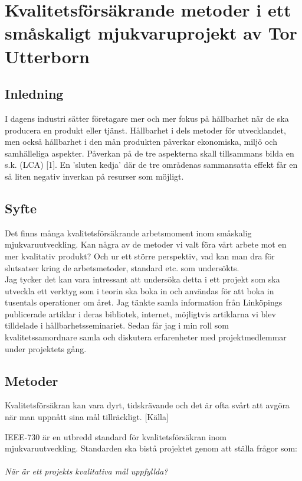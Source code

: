 \chapter{Kvalitetsförsäkrande metoder i ett småskaligt mjukvaruprojekt av Tor Utterborn}


\section{Inledning}
I dagens industri sätter företagare mer och mer fokus på hållbarhet när de ska producera en produkt eller tjänst. Hållbarhet i dels metoder för utvecklandet, men också hållbarhet i den mån produkten påverkar ekonomiska, miljö och samhälleliga aspekter.
Påverkan på de tre aspekterna skall tillsammans bilda en s.k. (LCA) [1]. En ’sluten kedja’ där de tre områdenas sammansatta effekt får en så liten negativ inverkan på resurser som möjligt.

\section{Syfte}
Det finns många kvalitetsförsäkrande arbetsmoment inom småskalig mjukvaruutveckling. Kan några av de metoder vi valt föra vårt arbete mot en mer kvalitativ produkt? Och ur ett större perspektiv, vad kan man dra för slutsatser kring de arbetsmetoder, standard etc. som undersökts. \\
Jag tycker det kan vara intressant att undersöka detta i ett projekt som ska utveckla ett verktyg som i teorin ska boka in och användas för att boka in tusentals operationer om året.
Jag tänkte samla information från Linköpings publicerade artiklar i deras bibliotek, internet, möjligtvis artiklarna vi blev tilldelade i hållbarhetsseminariet. Sedan får jag i min roll som kvalitetssamordnare samla och diskutera erfarenheter med projektmedlemmar under projektets gång.

\section{Metoder}

Kvalitetsförsäkran kan vara dyrt, tidskrävande och det är ofta svårt att avgöra när man uppnått sina mål tillräckligt. [Källa]

IEEE-730 är en utbredd standard för kvalitetsförsäkran inom mjukvaruutveckling. Standarden ska bistå projektet genom att ställa frågor som:
\\ \\
\emph{När är ett projekts kvalitativa mål uppfyllda?}

